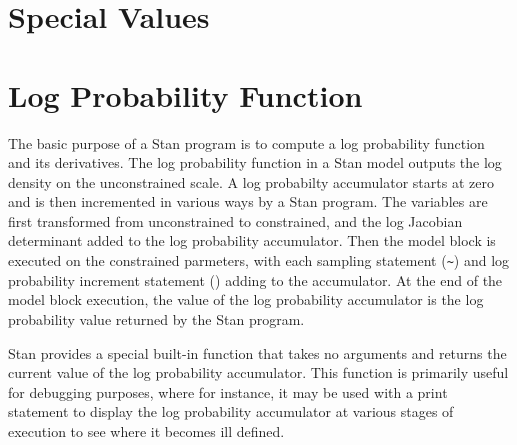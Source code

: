 %
\begin{description}
%
%
%
%
%
%
\end{description}

\section{Special Values}

\begin{description}
%
%
%
%
\end{description}


\section{Log Probability Function}\label{get-lp.section}

The basic purpose of a Stan program is to compute a log probability
function and its derivatives.  The log probability function in a Stan
model outputs the log density on the unconstrained scale.  A log
probabilty accumulator starts at zero and is then incremented in
various ways by a Stan program.  The variables are first transformed
from unconstrained to constrained, and the log Jacobian determinant
added to the log probability accumulator.  Then the model block is
executed on the constrained parmeters, with each sampling statement
(\Verb|~|) and log probability increment statement
() adding to the accumulator.  At the end
of the model block execution, the value of the log probability
accumulator is the log probability value returned by the Stan program.

Stan provides a special built-in function  that takes no
arguments and returns the current value of the log probability
accumulator.  This function is primarily useful for debugging
purposes, where for instance, it may be used with a print statement to
display the log probability accumulator at various stages of execution
to see where it becomes ill defined.

